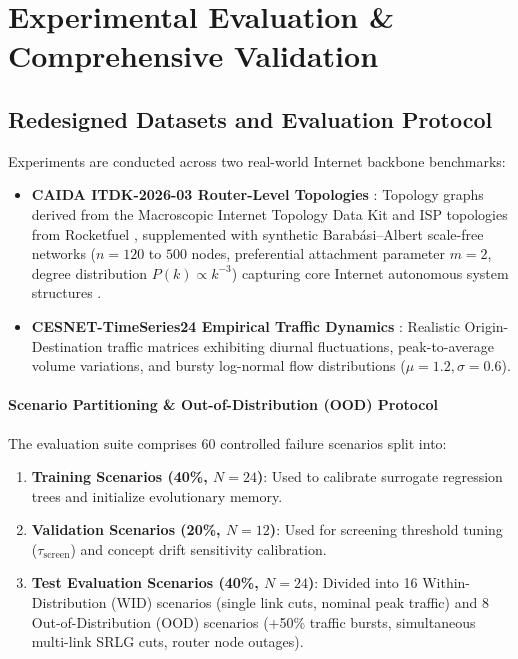 \documentclass[pdflatex,sn-mathphys-num]{sn-jnl}
\theoremstyle{thmstyleone}
\theoremstyle{thmstyletwo}
\theoremstyle{thmstylethree}
\begin{document}
\section{Experimental Evaluation \& Comprehensive Validation}\label{sec7}

\subsection{Redesigned Datasets and Evaluation Protocol}
Experiments are conducted across two real-world Internet backbone benchmarks:
\begin{itemize}
    \item \textbf{CAIDA ITDK-2026-03 Router-Level Topologies} \cite{caida_itdk_2026}: Topology graphs derived from the Macroscopic Internet Topology Data Kit \cite{claffy2009caida} and ISP topologies from Rocketfuel \cite{spring2002measuring}, supplemented with synthetic Barabási--Albert scale-free networks ($n = 120$ to $500$ nodes, preferential attachment parameter $m = 2$, degree distribution $P(k) \propto k^{-3}$) capturing core Internet autonomous system structures \cite{barabasi1999emergence}.
    \item \textbf{CESNET-TimeSeries24 Empirical Traffic Dynamics} \cite{cesnet_timeseries24}: Realistic Origin-Destination traffic matrices exhibiting diurnal fluctuations, peak-to-average volume variations, and bursty log-normal flow distributions ($\mu = 1.2, \sigma = 0.6$).
\end{itemize}

\paragraph{Scenario Partitioning \& Out-of-Distribution (OOD) Protocol}
The evaluation suite comprises 60 controlled failure scenarios split into:
\begin{enumerate}
    \item \textbf{Training Scenarios (40\%, $N = 24$)}: Used to calibrate surrogate regression trees and initialize evolutionary memory.
    \item \textbf{Validation Scenarios (20\%, $N = 12$)}: Used for screening threshold tuning ($\tau_{\mathrm{screen}}$) and concept drift sensitivity calibration.
    \item \textbf{Test Evaluation Scenarios (40\%, $N = 24$)}: Divided into 16 Within-Distribution (WID) scenarios (single link cuts, nominal peak traffic) and 8 Out-of-Distribution (OOD) scenarios (+50\% traffic bursts, simultaneous multi-link SRLG cuts, router node outages).
\end{enumerate}
\end{document}
